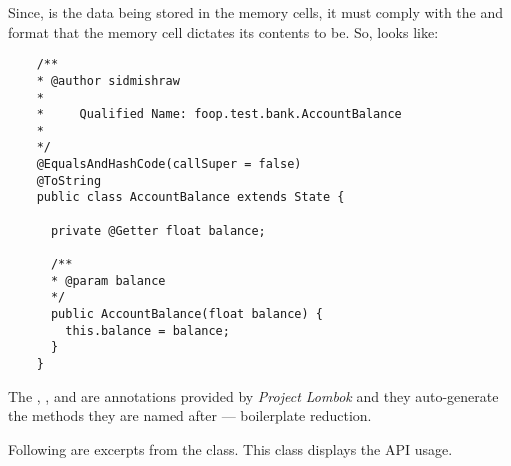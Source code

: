 \documentclass[../main]{subfiles}
\begin{document}
  Since,  is the data being stored in the memory cells, it must comply with the  and  format that the memory cell dictates its contents to be. So,  looks like: \par

  \begin{lstlisting}
    /**
    * @author sidmishraw
    *
    *     Qualified Name: foop.test.bank.AccountBalance
    *
    */
    @EqualsAndHashCode(callSuper = false)
    @ToString
    public class AccountBalance extends State {

      private @Getter float balance;

      /**
      * @param balance
      */
      public AccountBalance(float balance) {
        this.balance = balance;
      }
    }
  \end{lstlisting}

  The , , and  are annotations provided by {\em Project Lombok} and they auto-generate the methods they are named after --- boilerplate reduction. \par

  Following are excerpts from the  class. This class displays the API usage. 
  
\end{document}
